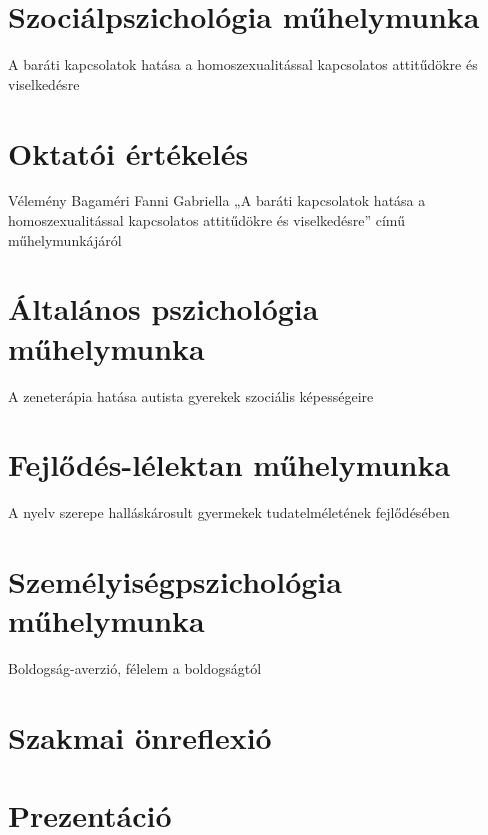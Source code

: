 \documentclass[12pt]{article}
\begin{document}




\pagebreak
\setcounter{tocdepth}{2}
\tableofcontents
\listoftables
\pagebreak
\justify
\newrefsection
\part{Szociálpszichológia műhelymunka}
\begin{large}
	\Large A baráti kapcsolatok hatása a  homoszexualitással kapcsolatos attitűdökre és viselkedésre
\end{large}

\printbibliography[title={Hivatkoz\'asok}]
\pagebreak
\part{Oktatói értékelés}
\begin{large}
	\large Vélemény Bagaméri Fanni Gabriella „A baráti kapcsolatok hatása a homoszexualitással kapcsolatos attitűdökre és viselkedésre” című műhelymunkájáról
\end{large}

\newrefsection
\pagebreak
\part{Általános pszichológia műhelymunka}
\begin{large}
	\Large A zeneterápia hatása autista gyerekek szociális képességeire
\end{large}

\printbibliography[title={Hivatkoz\'asok}]
\newrefsection
\pagebreak
\part{Fejlődés-lélektan műhelymunka}
\begin{large}
	\Large A nyelv szerepe halláskárosult gyermekek tudatelméletének fejlődésében
\end{large}

\printbibliography[title={Hivatkoz\'asok}]
\newrefsection
\pagebreak
\part{Személyiségpszichológia műhelymunka}
\begin{large}
	\Large Boldogság-averzió, félelem a boldogságtól
\end{large}

\printbibliography[title={Hivatkoz\'asok}]
\newrefsection
\pagebreak
\part{Szakmai önreflexió}
\pagebreak
\part{Prezentáció}
\pagebreak
\footnotesize
\end{document}
